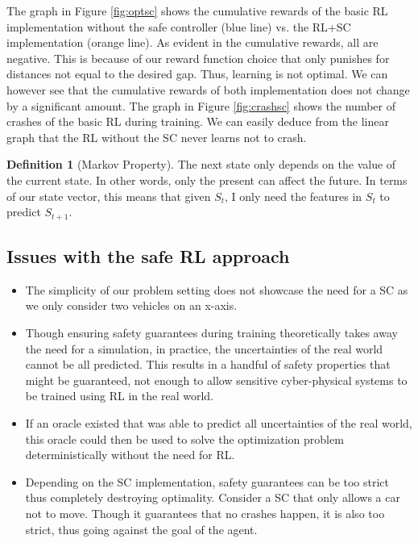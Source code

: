 \documentclass[a4paper,11pt]{article}
\theoremstyle{definition}
\newtheorem{definition}{Definition}[section]
\begin{document}
The graph in Figure \ref{fig:optsc} shows the cumulative rewards of the basic RL implementation without
the safe controller (blue line) vs. the RL+SC implementation (orange line). As evident in the cumulative rewards, all are negative. This is because of our reward function choice 
that only punishes for distances not equal to the desired gap. Thus, learning is not optimal. We can however see that the cumulative rewards of both implementation does not change by a significant 
amount. The graph in Figure \ref{fig:crashsc} shows 
the number of crashes of the basic RL during training. We can easily deduce from the linear graph that the RL without the SC never learns not to crash.


\begin{definition}[Markov Property]
  The next state only depends on the value of the current state. In other words, only the present can affect the future. 
  In terms of our state vector, this means that given $S_t$, I only need the features in $S_t$ to predict $S_{t+1}$.
\end{definition}

\subsection{Issues with the safe RL approach}
\begin{itemize}
  \item The simplicity of our problem setting does not showcase the need for a SC as we only consider two vehicles on an x-axis. 
  \item Though ensuring safety guarantees during training theoretically takes away the need for a simulation, in practice, the uncertainties 
        of the real world cannot be all predicted. This results in a handful of safety properties that might be guaranteed, not enough to allow sensitive cyber-physical systems 
        to be trained using RL in the real world. 
  \item If an oracle existed that was able to predict all uncertainties of the real world, this oracle could then be used to solve the optimization problem 
        deterministically without the need for RL. 
  \item Depending on the SC implementation, safety guarantees can be too strict thus completely destroying optimality. Consider a SC that only allows a car not to move. 
        Though it guarantees that no crashes happen, it is also too strict, thus going against the goal of the agent. 
  
\end{itemize}
\end{document}
